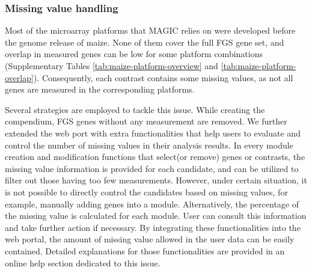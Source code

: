 \subsubsection{Missing value handling}

Most of the microarray platforms that MAGIC relies on were developed before the 
genome release of maize. 
None of them cover the full FGS gene set, and overlap in measured genes can be 
low for some platform combinations (Supplementary Tables 
\ref{tab:maize-platform-overview} and 
\ref{tab:maize-platform-overlap}).
Consequently, each contrast contains some missing values, as not all genes are 
measured in the corresponding platforms.

Several strategies are employed to tackle this issue.  While creating the 
compendium, FGS genes without any measurement are removed.  
We further extended the web port with extra functionalities that help users to 
evaluate and control the number of missing values in their analysis results.
%
In every module creation and modification functions that select(or remove) 
genes or contrasts, the missing value information is provided for each 
candidate, and can be utilized to filter out those having too few measurements.
%
However, under certain situation, it is not possible to directly control the 
candidates based on missing values, for example, manually adding genes into a 
module.
%
Alternatively, the percentage of the missing value is calculated for each 
module.
User can consult this information and take further action if necessary.
%
By integrating these functionalities into the web portal, the amount of missing 
value allowed in the user data can be easily contained.
%
Detailed explanations for those functionalities are provided in an 
online help section dedicated to this issue. 



%
%





